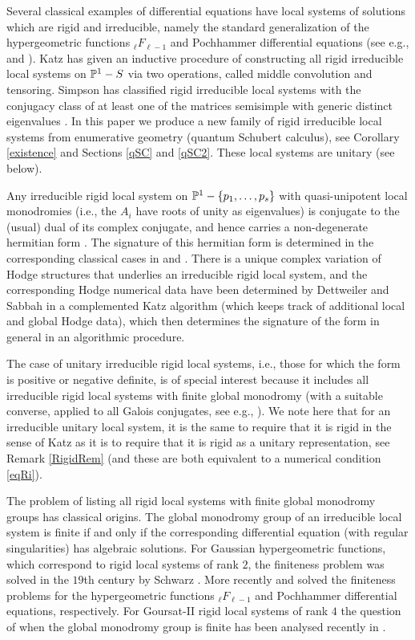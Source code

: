 Several classical examples of differential equations have local systems of solutions which are rigid and irreducible, namely the standard generalization of the hypergeometric functions  ${}_{\ell}F_{\ell-1}$ and Pochhammer differential equations (see e.g., \cite{BH} and \cite{Haraoka}).  Katz  \cite{Katz} has given an inductive procedure of constructing all  rigid irreducible local systems on  $\Bbb{P}^1-S$ via two operations, called middle convolution and tensoring. Simpson has classified rigid irreducible local systems with the conjugacy class of at least one of the matrices semisimple with generic distinct eigenvalues \cite{SimOld}. In this paper we produce a new family of rigid irreducible local systems from enumerative geometry (quantum Schubert calculus), see Corollary \ref{existence} and Sections \ref{qSC} and \ref{qSC2}. These local systems are unitary (see below).

Any irreducible rigid local system on $\Bbb{P}^1-\{p_1,\dots,p_s\}$ with quasi-unipotent local monodromies (i.e., the $A_i$ have roots of unity as eigenvalues)  is conjugate to the (usual) dual of its complex conjugate, and hence carries a non-degenerate hermitian form
\cite[Section 9.5] {Katz}. The signature of this hermitian form  is determined  in the corresponding classical cases in \cite{BH} and \cite{Haraoka}. There is a unique complex variation of Hodge structures that underlies an irreducible rigid local system, and the corresponding Hodge numerical data have been determined by Dettweiler and Sabbah \cite{DS} in a complemented Katz algorithm (which keeps track of additional local and global Hodge data), which then determines the signature of the form in general in an algorithmic procedure.

The case of unitary irreducible rigid local systems, i.e., those for which the form is positive or negative definite, is of special interest because it includes all irreducible rigid local systems with finite global monodromy (with a suitable converse, applied to all Galois conjugates, see e.g., \cite[Theorem 11]{BLocal}). We note here that for an irreducible unitary local system, it is the same to require that it is rigid in the sense of Katz as it is to require that it is rigid as a unitary representation, see Remark \ref{RigidRem} (and these are both equivalent to a numerical condition \eqref{eqRi}).

The problem of listing all rigid local systems with finite  global monodromy groups has classical origins. The global monodromy group of an irreducible local system is finite  if and only if  the corresponding differential equation (with regular singularities) has algebraic solutions. For  Gaussian hypergeometric functions, which correspond to rigid local systems of rank $2$, the finiteness problem was solved in the $19$th century by Schwarz \cite{Schwarz}. More recently \cite{BH} and \cite{Haraoka} solved the finiteness problems for  the hypergeometric functions  ${}_{\ell}F_{\ell-1}$ and Pochhammer differential equations, respectively. For Goursat-II rigid local systems \cite{EGoursat} of rank $4$ the question of when the global monodromy group is finite has been analysed recently in \cite{Goursat}.

